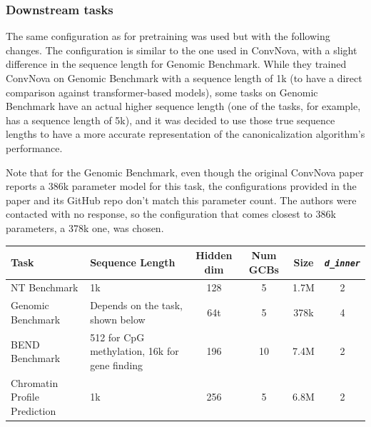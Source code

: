 \documentclass[   ]{article}
\let\oldtexttt\texttt
\renewcommand{\texttt}[1]{\oldtexttt{\itshape #1}}
\begin{document}
\subsubsection{Downstream tasks}\label{sec:appendix_downstream_tasks}

The same configuration as for pretraining was used but with the
following changes. The configuration is similar to the one used in ConvNova, with a slight difference in the sequence length for Genomic Benchmark. While they trained ConvNova on Genomic Benchmark with a sequence length of 1k (to have a direct comparison against transformer-based models), some tasks on Genomic Benchmark have an actual higher sequence length (one of the tasks, for example, has a sequence length of 5k), and it was decided to use those true sequence lengths to have a more accurate representation of the canonicalization algorithm's performance.

Note that for the Genomic Benchmark, even though the original ConvNova paper reports a 386k parameter model for this task, the configurations provided in the paper and its GitHub repo don't match this parameter count. The authors were contacted with no response, so the configuration that comes closest to 386k parameters, a 378k one, was chosen.

\begin{table}[ht]
	\centering
	\begin{tabularx}{\textwidth}{X X c c c c}
		\toprule
		Task & Sequence Length & Hidden dim & Num GCBs & Size & \texttt{d\_inner} \\
		\midrule
		NT Benchmark & 1k & 128 & 5 & 1.7M & 2 \\
		Genomic Benchmark & Depends on the task, shown below & 64t & 5 & 378k & 4 \\
		BEND Benchmark & 512 for CpG methylation, 16k for gene finding & 196 & 10 & 7.4M & 2 \\
		Chromatin Profile Prediction & 1k & 256 & 5 & 6.8M & 2 \\
		\bottomrule
	\end{tabularx}
\end{table}
\end{document}
